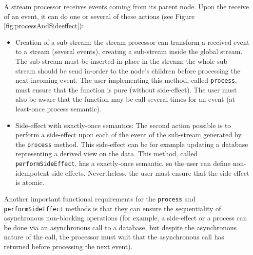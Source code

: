 A stream processor receives events coming from its parent node. Upon the receive of an event, it can do one or several of these
actions (see Figure \ref{fig:processAndSideeffect}):
\begin{itemize}
  \item Creation of a sub-stream: the stream processor can transform a received event to a stream (several events), creating a sub-stream
  inside the global stream. The sub-stream must be inserted in-place in the stream: the whole sub-stream should be
  send in-order to the node's children before processing the next incoming event.
  The user implementing this method, called \verb|process|, must ensure that the function is pure (without side-effect).
  The user must also be aware that the function may be call several times for an event (at-least-once process semantic).
  \item Side-effect with exactly-once semantics: The second action possible is to perform a side-effect upon each of the event
  of the sub-stream generated by the \verb|process| method. This side-effect can be for example updating a database representing
  a derived view on the data. This method, called \verb|performSideEffect|, has a exactly-once semantic, so the user
  can define non-idempotent side-effects. Nevertheless, the user must ensure that the side-effect is atomic. 
\end{itemize}

Another important functional requirements for the \verb|process| and \verb|performSideEffect| methods is that they can ensure the
sequentiality of asynchronous non-blocking operations (for example, a side-effect or a process can be done via an asynchronous call to a 
database, but despite the asynchronous nature of the call, the processor must wait that the asynchronous call has returned
before processing the next event).


